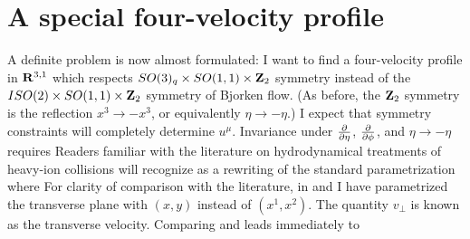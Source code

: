 \documentclass[12pt]{article}
\begin{document}
\section{A special four-velocity profile}
\label{VELOCITY}

A definite problem is now almost formulated: I want to find a four-velocity profile in ${\bf R}^{3,1}$ which respects $SO(3)_q \times SO(1,1) \times {\bf Z}_2$ symmetry instead of the $ISO(2) \times SO(1,1) \times {\bf Z}_2$ symmetry of Bjorken flow.  (As before, the ${\bf Z}_2$ symmetry is the reflection $x^3 \to -x^3$, or equivalently $\eta \to -\eta$.)  I expect that symmetry constraints will completely determine $u^\mu$.  Invariance under ${\partial \over \partial\eta}$, ${\partial \over \partial\phi}$, and $\eta \to -\eta$ requires
Readers familiar with the literature on hydrodynamical treatments of heavy-ion collisions will recognize  as a rewriting of the standard parametrization
where
For clarity of comparison with the literature, in  and  I have parametrized the transverse plane with $(x,y)$ instead of $(x^1,x^2)$.  The quantity $v_\perp$ is known as the transverse velocity.  Comparing  and  leads immediately to
\end{document}
